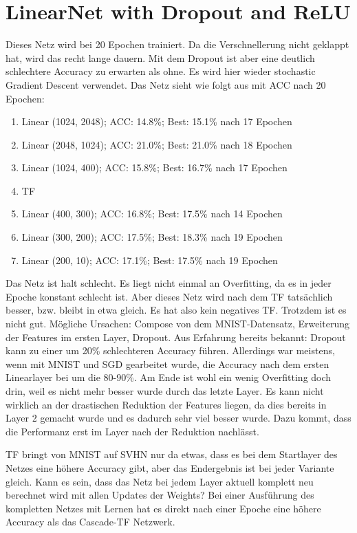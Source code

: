 \section{LinearNet with Dropout and ReLU}
    Dieses Netz wird bei 20 Epochen trainiert. Da die Verschnellerung nicht geklappt hat, 
    wird das recht lange dauern. Mit dem Dropout ist aber eine deutlich schlechtere Accuracy 
    zu erwarten als ohne. Es wird hier wieder stochastic Gradient Descent verwendet. 
    Das Netz sieht wie folgt aus mit ACC nach 20 Epochen: 
    \begin{enumerate}
        \item Linear (1024, 2048); ACC: 14.8\%; Best: 15.1\% nach 17 Epochen
        \item Linear (2048, 1024); ACC: 21.0\%; Best: 21.0\% nach 18 Epochen
        \item Linear (1024, 400); ACC: 15.8\%; Best: 16.7\% nach 17 Epochen
        \item TF
        \item Linear (400, 300); ACC: 16.8\%; Best: 17.5\% nach 14 Epochen
        \item Linear (300, 200); ACC: 17.5\%; Best: 18.3\% nach 19 Epochen
        \item Linear (200, 10); ACC: 17.1\%; Best: 17.5\% nach 19 Epochen
    \end{enumerate}
    Das Netz ist halt schlecht. Es liegt nicht einmal an Overfitting, da es in jeder Epoche 
    konstant schlecht ist.
    Aber dieses Netz wird nach dem TF tatsächlich besser, bzw. bleibt in etwa gleich. 
    Es hat also kein negatives TF. Trotzdem ist es nicht gut. Mögliche Ursachen: 
    Compose von dem MNIST-Datensatz, Erweiterung der Features im ersten Layer, Dropout. 
    Aus Erfahrung bereits bekannt: Dropout kann zu einer um 20\% schlechteren Accuracy 
    führen. 
    Allerdings war meistens, wenn mit MNIST und SGD gearbeitet wurde, die Accuracy nach dem 
    ersten Linearlayer bei um die 80-90\%. 
    Am Ende ist wohl ein wenig Overfitting doch drin, weil es nicht mehr besser wurde durch 
    das letzte Layer. Es kann nicht wirklich an der drastischen Reduktion der Features liegen, 
    da dies bereits in Layer 2 gemacht wurde und es dadurch sehr viel besser wurde. Dazu kommt, 
    dass die Performanz erst im Layer nach der Reduktion nachlässt.

    TF bringt von MNIST auf SVHN nur da etwas, dass es bei dem Startlayer des Netzes eine 
    höhere Accuracy gibt, aber das Endergebnis ist bei jeder Variante gleich. Kann es sein, dass 
    das Netz bei jedem Layer aktuell komplett neu berechnet wird mit allen Updates der Weights?
    Bei einer Ausführung des kompletten Netzes mit Lernen hat es direkt nach einer Epoche eine 
    höhere Accuracy als das Cascade-TF Netzwerk.
